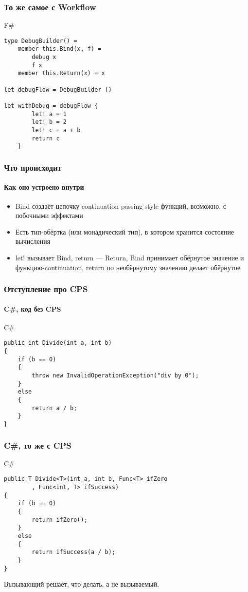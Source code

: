 \documentclass[xetex,mathserif,serif]{beamer}
\begin{document}
	\begin{frame}[fragile]
		\frametitle{То же самое с Workflow}
		\begin{exampleblock}{F\#}
			\begin{verbatim}
type DebugBuilder() =
    member this.Bind(x, f) = 
        debug x 
        f x
    member this.Return(x) = x

let debugFlow = DebugBuilder ()

let withDebug = debugFlow {
        let! a = 1
        let! b = 2
        let! c = a + b
        return c
    }
			\end{verbatim}
		\end{exampleblock}
\end{frame}

	\begin{frame}
		\frametitle{Что происходит}
		\framesubtitle{Как оно устроено внутри}
		\begin{itemize}
			\item Bind создаёт цепочку continuation passing style-функций, возможно, с побочными эффектами
			\item Есть тип-обёртка (или монадический тип), в котором хранится состояние вычисления
			\item let! вызывает Bind, return --- Return, Bind принимает обёрнутое значение и функцию-continuation, return по необёрнутому значению делает обёрнутое
		\end{itemize}
	\end{frame}

	\begin{frame}[fragile]
		\frametitle{Отступление про CPS}
		\framesubtitle{C\#, код без CPS}
		\begin{exampleblock}{C\#}
			\begin{verbatim}
public int Divide(int a, int b)
{
    if (b == 0)
    {
        throw new InvalidOperationException("div by 0");
    }
    else
    {
        return a / b;
    }
}
			\end{verbatim}
		\end{exampleblock}
\end{frame}

	\begin{frame}[fragile]
		\frametitle{C\#, то же с CPS}
		\begin{exampleblock}{C\#}
			\begin{verbatim}
public T Divide<T>(int a, int b, Func<T> ifZero
        , Func<int, T> ifSuccess)
{
    if (b == 0)
    {
        return ifZero();
    }
    else
    {
        return ifSuccess(a / b);
    }
}
			\end{verbatim}
		\end{exampleblock}
		Вызывающий решает, что делать, а не вызываемый.
\end{frame}
\end{document}
